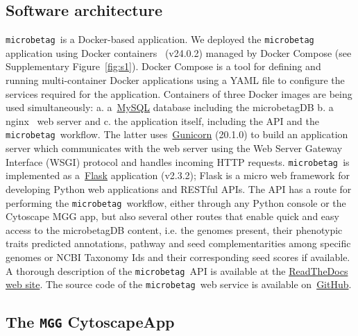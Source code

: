 \documentclass[sn-mathphys,Numbered]{sn-jnl}  %
\theoremstyle{thmstyleone}%
\theoremstyle{thmstyletwo}%
\theoremstyle{thmstylethree}%
\newcommand{\microbetag}{\texttt{microbetag }}
\begin{document}
    \subsection*{Software architecture}
    \label{subsec:webserver}


        \microbetag is a Docker-based application.
        We deployed the \microbetag application using Docker containers~\cite{merkel2014docker} (v24.0.2)  managed by Docker Compose (see Supplementary Figure~\ref{fig:s1}).
        Docker Compose is a tool for defining and running multi-container Docker applications using a YAML file to configure the services required for the application.
        Containers of three Docker images are being used simultaneously:
        a. a~\href{https://www.mysql.com}{MySQL} database including the microbetagDB
        b. a nginx~\cite{nginx} web server and 
        c. the application itself, including the API and the \microbetag workflow.
        The latter uses~\href{https://gunicorn.org}{Gunicorn} (20.1.0) to build an application server which communicates with the web server using the Web Server Gateway Interface (WSGI) protocol and handles incoming HTTP requests.
        \microbetag is implemented as a~\href{https://flask.palletsprojects.com/en/3.0.x/}{Flask} application (v2.3.2); 
        Flask is a micro web framework for developing Python web applications and RESTful APIs.
        The API has a route for performing the \microbetag workflow, either through any Python console or the Cytoscape MGG app, but also several other routes that enable quick and easy access to the microbetagDB content, i.e. the genomes present, their phenotypic traits predicted annotations, pathway and seed complementarities among specific genomes or NCBI Taxonomy Ids and their corresponding seed scores if available.
        A thorough description of the \microbetag API is available at the \href{https://hariszaf.github.io/microbetag/docs/api/}{ReadTheDocs web site}. 
        The source code of the \microbetag web service is available on~\href{https://github.com/msysbio/microbetagApp/}{GitHub}.


    \subsection*{The \texttt{MGG} CytoscapeApp}
    \label{subsec:build-cytoapp}
\end{document}
